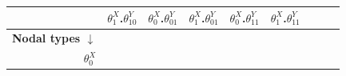 \documentclass[12pt,]{book}
\begin{document}
\begin{longtable}[]{@{}rcccccccc@{}}
\begin{minipage}[b]{0.08\columnwidth}
\end{minipage} & \begin{minipage}[b]{0.08\columnwidth}\centering
\(\theta^X_1\).\(\theta^Y_{10}\)\strut
\end{minipage} & \begin{minipage}[b]{0.08\columnwidth}\centering
\(\theta^X_0\).\(\theta^Y_{01}\)\strut
\end{minipage} & \begin{minipage}[b]{0.08\columnwidth}\centering
\(\theta^X_1\).\(\theta^Y_{01}\)\strut
\end{minipage} & \begin{minipage}[b]{0.08\columnwidth}\centering
\(\theta^X_0\).\(\theta^Y_{11}\)\strut
\end{minipage} & \begin{minipage}[b]{0.08\columnwidth}\centering
\(\theta^X_1\).\(\theta^Y_{11}\)\strut
\end{minipage}\tabularnewline
\midrule
\endhead
\begin{minipage}[t]{0.12\columnwidth}\raggedleft
\textbf{Nodal types \(\downarrow\)}\strut
\end{minipage} & \begin{minipage}[t]{0.08\columnwidth}\centering
\strut
\end{minipage} & \begin{minipage}[t]{0.08\columnwidth}\centering
\strut
\end{minipage} & \begin{minipage}[t]{0.08\columnwidth}\centering
\strut
\end{minipage} & \begin{minipage}[t]{0.08\columnwidth}\centering
\strut
\end{minipage} & \begin{minipage}[t]{0.08\columnwidth}\centering
\strut
\end{minipage} & \begin{minipage}[t]{0.08\columnwidth}\centering
\strut
\end{minipage} & \begin{minipage}[t]{0.08\columnwidth}\centering
\strut
\end{minipage} & \begin{minipage}[t]{0.08\columnwidth}\centering
\strut
\end{minipage}\tabularnewline
\begin{minipage}[t]{0.12\columnwidth}\raggedleft
\(\theta^X_0\)\strut
\end{minipage} & \begin{minipage}[t]{0.08\columnwidth}\centering

\end{minipage}
\end{longtable}
\end{document}
